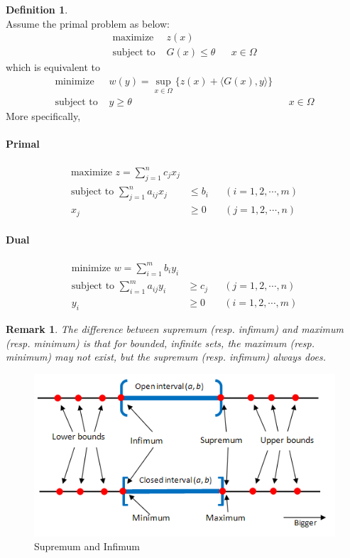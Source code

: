 \documentclass[a4paper]{article}
\theoremstyle{definition}
\newtheorem{definition}{Definition}
\theoremstyle{plain}
\newtheorem{remark}{Remark}
\begin{document}
\begin{definition}
\\
Assume the primal problem as below:
\begin{align*}
    \text{maximize }&z(x)\\
    \text{subject to }&G(x)\le\theta && x\in\Omega
\end{align*}
which is equivalent to
\begin{align*}
    \text{minimize }&w(y)=\sup_{x\in\Omega}\{z(x)+\langle G(x),y\rangle\}\\
    \text{subject to }&y\ge\theta && x\in\Omega
\end{align*}
More specifically,
\paragraph{Primal}
\begin{align*}
    \text{maximize }z=\sum^n_{j=1}c_jx_j&\\
    \text{subject to }\sum^n_{j=1}a_{ij}x_j&\le b_i && (i=1,2,\cdots,m)\\
    x_j&\ge0 && (j=1,2,\cdots,n)
\end{align*}
\paragraph{Dual}
\begin{align*}
    \text{minimize }w=\sum^m_{i=1}b_iy_i&\\
    \text{subject to }\sum^m_{i=1}a_{ij}y_i&\ge c_j && (j=1,2,\cdots,n)\\
    y_i&\ge0 && (i=1,2,\cdots,m)
\end{align*}
\end{definition}

\begin{remark}
The difference between supremum (resp. infimum) and maximum (resp. minimum) is that for bounded, infinite sets, the maximum (resp. minimum) may not exist, but the supremum (resp. infimum) always does.
\end{remark}

\begin{figure}[H]
\centering
\includegraphics[scale=0.4]{figure/supinf.png}
\caption{Supremum and Infimum}
\end{figure}
\end{document}
